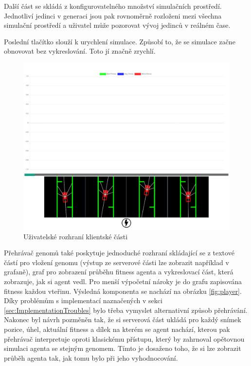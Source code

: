 Další část se skládá z konfigurovatelného množství simulačních prostředí. Jednotliví jedinci v generaci jsou pak rovnoměrně rozloženi mezi všechna simulační prostředí a uživatel může pozorovat vývoj jedinců v reálném čase.

Poslední tlačítko slouží k urychlení simulace. Způsobí to, že se simulace začne obnovovat bez vykreslování. Toto jí značně zrychlí.

\begin{figure}[h!]
	\centering
	\includegraphics[width=0.6\linewidth]{visualization}
	\caption{Uživatelské rozhraní klientské části}
	\label{fig:visualization}
\end{figure}

Přehrávač genomů také poskytuje jednoduché rozhraní skládající se z textové částí pro vložení genomu (výstup ze serverové části lze zobrazit například v grafaně), graf pro zobrazení průběhu fitness agenta a vykreslovací část, která zobrazuje, jak si agent vedl. Pro menší výpočetní nároky je do grafu zapisována fitness každou vteřinu.  Výsledná komponenta se nachází na obrázku \ref{fig:player}.\\
Díky problémům s implementací naznačených v sekci \ref{sec:ImplementationTroubles} bylo třeba vymyslet alternativní způsob přehrávání. Nakonec byl návrh pozměněn tak, že si serverová část ukládá pro každý snímek pozice, úhel, aktuální fitness a dílek na kterém se agent nachází, kterou pak přehrávač interpretuje oproti klasickému přístupu, který by zahrnoval opětovnou simulaci agenta se stejným genomem. Tímto je dosaženo toho, že si lze zobrazit průběh agenta tak, jak tomu bylo při jeho vyhodnocování.

